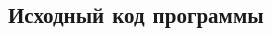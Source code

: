 \documentclass[14pt]{extreport}
\begin{document}
\begin{thebibliography}{9}
\end{thebibliography}
\newpage

\begin{appendices}
\chapter{Исходный код программы}
{\footnotesize

\newpage

\newpage

\newpage

\newpage

\newpage

\newpage

\newpage

\newpage

}
\end{appendices}
\end{document}
